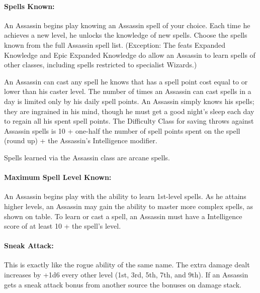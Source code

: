 \paragraph{Spells Known:} An Assassin begins play knowing an Assassin spell of your choice. 
Each time he achieves a new level, he unlocks the knowledge of new spells.
Choose the spells known from the full Assassin spell list.
(Exception: The feats Expanded Knowledge and Epic Expanded Knowledge 
do allow an Assassin to learn spells of other classes, 
including spells restricted to specialist Wizards.) 

An Assassin can cast any spell he knows that has a spell point cost equal to or lower than his caster level.
The number of times an Assassin can cast spells in a day is limited only by his daily spell points. 
An Assassin simply knows his spells; they are ingrained in his mind, 
though he must get a good night's sleep each day to regain all his spent spell points.
The Difficulty Class for saving throws against Assassin spells is 
10 + one-half the number of spell points spent on the spell (round up) + the Assassin's Intelligence modifier. 

Spells learned via the Assassin class are arcane spells.
\paragraph{Maximum Spell Level Known:} An Assassin begins play with the ability to learn 1st-level spells. 
As he attains higher levels, 
an Assassin may gain the ability to master more complex spells, as shown on  table.
To learn or cast a spell, an Assassin must have a Intelligence score of at least 10 + the spell's level.

\paragraph{Sneak Attack:}
This is exactly like the rogue ability of the same name. 
The extra damage dealt increases by +1d6 every other level (1st, 3rd, 5th, 7th, and 9th). 
If an Assassin gets a sneak attack bonus from another source the bonuses on damage stack.

